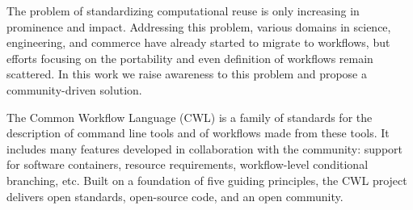 \documentclass[sigconf,revew,screen,timestamp,nonacm]{acmart}
\begin{document}
The problem of standardizing computational reuse is only increasing in prominence and impact. Addressing this problem, various domains in science, engineering, and commerce have already started to migrate to workflows, but efforts focusing on the portability and even definition of workflows remain scattered. In this work we raise awareness to this problem and propose a community-driven solution.

The Common Workflow Language (CWL) is a family of standards for the description of command line tools and of workflows made from these tools. It includes many features developed in collaboration with the community: support for software containers, resource requirements, workflow-level conditional branching, etc. Built on a foundation of five guiding principles, the CWL project delivers open standards, open-source code, and an open community.
\end{document}
